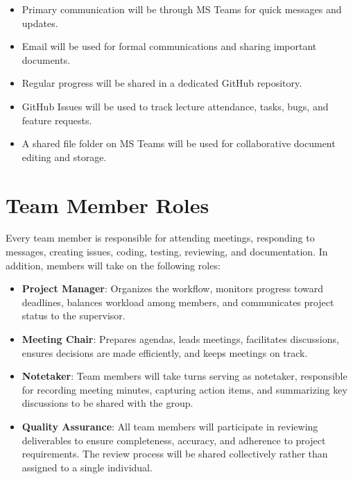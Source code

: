\documentclass{article}
\begin{document}
\begin{itemize}
  \item Primary communication will be through MS Teams for quick messages and updates.
  \item Email will be used for formal communications and sharing important documents.
  \item Regular progress will be shared in a dedicated GitHub repository.
  \item GitHub Issues will be used to track lecture attendance, tasks, bugs, and feature requests.
  \item A shared file folder on MS Teams will be used for collaborative document editing and storage.
\end{itemize}

\section{Team Member Roles}


Every team member is responsible for attending meetings, responding to messages, creating issues, coding, testing, 
reviewing, and documentation. In addition, members will take on the following roles:

\begin{itemize}
  \item \textbf{Project Manager}: Organizes the workflow, monitors progress toward deadlines, balances workload among members, and communicates project status to the supervisor.
  
  \item \textbf{Meeting Chair}: Prepares agendas, leads meetings, facilitates discussions, ensures decisions are made efficiently, and keeps meetings on track.
  
  \item \textbf{Notetaker}: Team members will take turns serving as notetaker, responsible for recording meeting minutes, capturing action items, and summarizing key discussions to be shared with the group.
  
  \item \textbf{Quality Assurance}: All team members will participate in reviewing deliverables to ensure completeness, accuracy, and adherence to project requirements. The review process will be shared collectively rather than assigned to a single individual.
\end{itemize}
\end{document}
